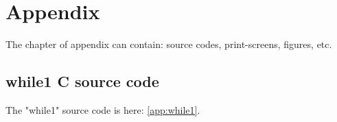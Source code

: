 \chapter*{Appendix}

The chapter of appendix can contain: source codes, print-screens, figures, etc.

\section{while1 C source code}

The "while1" source code is here: \ref{app:while1}.


\label{app:while1}

